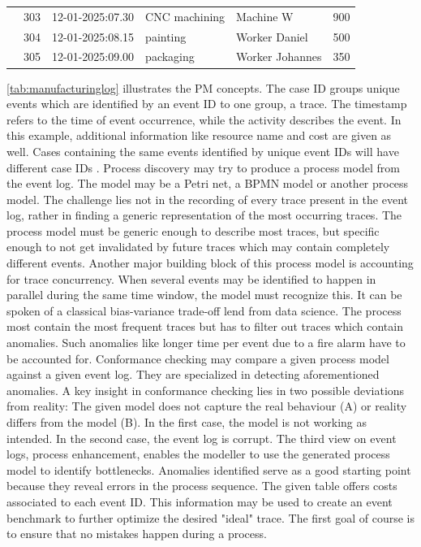 \begin{table}[htbp]
{\begin{tabular}{r r l l l r}
                       & 303               & 12-01-2025:07.30   & CNC machining         & Machine W          & 900           \\
                       & 304               & 12-01-2025:08.15   & painting              & Worker Daniel      & 500           \\
                       & 305               & 12-01-2025:09.00   & packaging             & Worker Johannes    & 350           \\
      \bottomrule
    \end{tabular}%
  }
\end{table}

\autoref{tab:manufacturinglog} illustrates the PM concepts. The case ID groups unique events which are identified by an event ID to one group, a trace. The timestamp refers to the time of event occurrence, while the activity describes the event. In this example, additional information like resource name and cost are given as well. Cases containing the same events identified by unique event IDs will have different case IDs \autocite{van2016data}. Process discovery may try to produce a process model from the event log. The model may be a Petri net, a BPMN model or another process model. The challenge lies not in the recording of every trace present in the event log, rather in finding a generic representation of the most occurring traces. The process model must be generic enough to describe most traces, but specific enough to not get invalidated by future traces which may contain completely different events. Another major building block of this process model is accounting for trace concurrency. When several events may be identified to happen in parallel during the same time window, the model must recognize this. It can be spoken of a classical bias-variance trade-off lend from data science. The process most contain the most frequent traces but has to filter out traces which contain anomalies. Such anomalies like longer time per event due to a fire alarm have to be accounted for. Conformance checking may compare a given process model against a given event log. They are specialized in detecting aforementioned anomalies. A key insight in conformance checking lies in two possible deviations from reality: The given model does not capture the real behaviour (A) or reality differs from the model (B). In the first case, the model is not working as intended. In the second case, the event log is corrupt. The third view on event logs, process enhancement, enables the modeller to use the generated process model to identify bottlenecks. Anomalies identified serve as a good starting point because they reveal errors in the process sequence. The given table offers costs associated to each event ID. This information may be used to create an event benchmark to further optimize the desired "ideal" trace. The first goal of course is to ensure that no mistakes happen during a process.

